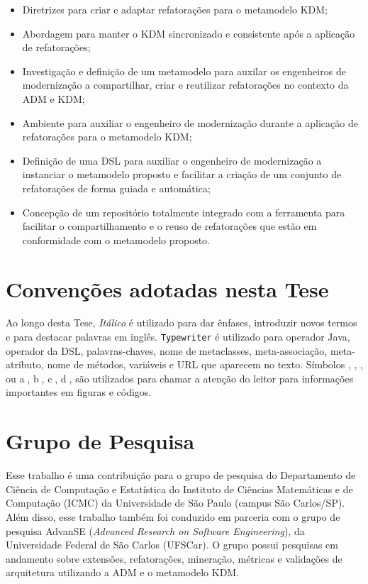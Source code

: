 \begin{itemize}
	\item Diretrizes para criar e adaptar refatorações para o metamodelo KDM;
	\item Abordagem para manter o KDM sincronizado e consistente após a aplicação de refatorações;
	\item Investigação e definição de um metamodelo para auxilar os engenheiros de modernização a compartilhar, criar e reutilizar refatorações no contexto da ADM e KDM;
	\item Ambiente para auxiliar o engenheiro de modernização durante a aplicação de refatorações para o metamodelo KDM;
	\item Definição de uma DSL para auxiliar o engenheiro de modernização a instanciar o metamodelo proposto e facilitar a criação de um conjunto de refatorações de forma guiada e automática;
	\item Concepção de um repositório totalmente integrado com a ferramenta para facilitar o compartilhamento e o reuso de refatorações que estão em conformidade com o metamodelo proposto.
\end{itemize}
    
\section{Convenções adotadas nesta Tese}\label{sec:convencoes}

Ao longo desta Tese, \textit{Itálico} é utilizado para dar ênfases, introduzir novos termos e para destacar palavras em inglês. \texttt{Typewriter} é utilizado para operador Java, operador da DSL, palavras-chaves, nome de metaclasses, meta-associação, meta-atributo, nome de métodos, variáveis e URL que aparecem no texto. Símbolos , , ,  ou \textcircled{a}, \textcircled{b}, \textcircled{c}, \textcircled{d}, são utilizados para chamar a atenção do leitor para informações importantes em figuras e códigos.

\section{Grupo de Pesquisa}

Esse trabalho é uma contribuição para o grupo de pesquisa do Departamento de Ciência de Computação e Estatística do Instituto de Ciências Matemáticas e de Computação (ICMC) da Universidade de São Paulo (campus São Carlos/SP). Além disso, esse trabalho também foi conduzido em parceria com o grupo de pesquisa AdvanSE (\textit{Advanced Research on Software Engineering}), da Universidade Federal de São Carlos (UFSCar). O grupo possui pesquisas em andamento sobre extensões, refatorações, mineração, métricas e validações de arquitetura utilizando a ADM e o metamodelo KDM.

